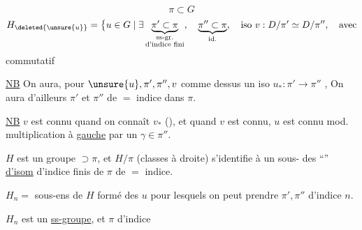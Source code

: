 
\[ \pi\subset G \]
\[
H_{\deleted{\unsure{u}}}=\bigl\{u\in G\mid \exists
\underbrace{\pi'\subset\pi}_{\substack{\text{ss-gr.}\\\text{d'indice fini}}},\quad
\underbrace{\pi''\subset\pi}_{\text{id.}},
\quad\text{iso }v:D/\pi'\simeq D/\pi'',\quad\text{avec}
\]
commutatif

\uline{NB} On aura, pour $\unsure{u},\pi',\pi'',v$ comme dessus un iso
$u_*:\pi'\longrightarrow\pi''$ ,
On aura d'ailleurs $\pi'$ et $\pi''$ de $=$ indice dans $\pi$.

\uline{NB} $v$ est connu quand on connaît $v_*$ (\uline{}), et quand $v$ est connu, $u$ est connu  mod. multiplication à \uline{gauche} par un $\gamma\in\pi''$.


$H$ est un groupe $\supset\pi$, et $H/\pi$ (classes à droite) s'identifie à un sous- des ``'' \uline{d'isom}   d'indice finis de $\pi$ de $=$ indice.

$H_n=$ sous-ens de $H$ formé des $u$ pour lesquels on peut prendre $\pi',\pi''$ d'indice $n$.

$H_n$ est un \uline{ss-groupe}, et $\pi$ d'indice

